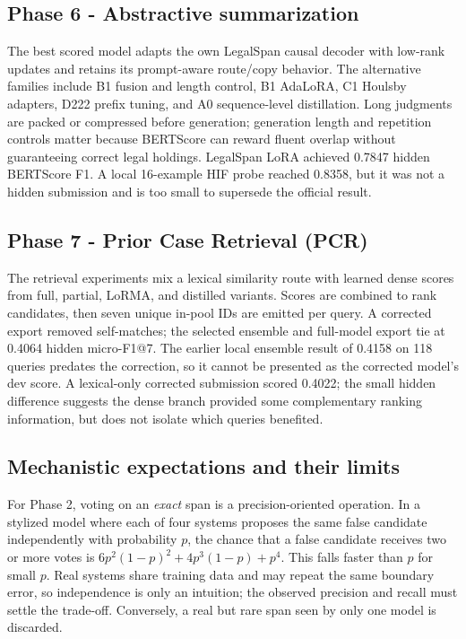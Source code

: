 \documentclass[11pt,oneside]{article}
\begin{document}
\subsection{Phase 6 - Abstractive summarization}
The best scored model adapts the own LegalSpan causal decoder with low-rank updates \cite{hu2022lora} and retains its prompt-aware route/copy behavior. The alternative families include B1 fusion and length control, B1 AdaLoRA, C1 Houlsby adapters, D222 prefix tuning, and A0 sequence-level distillation. Long judgments are packed or compressed before generation; generation length and repetition controls matter because BERTScore can reward fluent overlap without guaranteeing correct legal holdings. LegalSpan LoRA achieved 0.7847 hidden BERTScore F1. A local 16-example HIF probe reached 0.8358, but it was not a hidden submission and is too small to supersede the official result.

\subsection{Phase 7 - Prior Case Retrieval (PCR)}
The retrieval experiments mix a lexical similarity route with learned dense scores from full, partial, LoRMA, and distilled variants. Scores are combined to rank candidates, then seven unique in-pool IDs are emitted per query. A corrected export removed self-matches; the selected ensemble and full-model export tie at 0.4064 hidden micro-F1@7. The earlier local ensemble result of 0.4158 on 118 queries predates the correction, so it cannot be presented as the corrected model's dev score. A lexical-only corrected submission scored 0.4022; the small hidden difference suggests the dense branch provided some complementary ranking information, but does not isolate which queries benefited.

\subsection{Mechanistic expectations and their limits}
For Phase 2, voting on an \emph{exact} span is a precision-oriented operation. In a stylized model where each of four systems proposes the same false candidate independently with probability $p$, the chance that a false candidate receives two or more votes is $6p^2(1-p)^2+4p^3(1-p)+p^4$. This falls faster than $p$ for small $p$. Real systems share training data and may repeat the same boundary error, so independence is only an intuition; the observed precision and recall must settle the trade-off. Conversely, a real but rare span seen by only one model is discarded.
\end{document}
